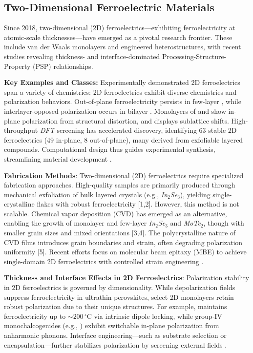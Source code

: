 \documentclass[a4paper,fleqn]{cas-sc}
\begin{document}
\subsection*{Two-Dimensional Ferroelectric Materials}
\par Since 2018, two-dimensional (2D) ferroelectrics—exhibiting ferroelectricity at atomic-scale thicknesses—have emerged as a pivotal research frontier. These include van der Waals monolayers and engineered heterostructures, with recent studies revealing thickness- and interface-dominated Processing-Structure-Property (PSP) relationships.

\par \textbf{Key Examples and Classes:} Experimentally demonstrated 2D ferroelectrics span a variety of chemistries: 2D ferroelectrics exhibit diverse chemistries and polarization behaviors. Out-of-plane ferroelectricity persists in few-layer , while interlayer-opposed polarization occurs in bilayer . Monolayers of  and  show in-plane polarization from structural distortion, and  displays sublattice shifts. High-throughput \textit{DFT} screening has accelerated discovery, identifying \num{63} stable 2D ferroelectrics (\num{49} in-plane, \num{8} out-of-plane), many derived from exfoliable layered compounds. Computational design thus guides experimental synthesis, streamlining material development \cite{kruse2023two}.

\par \textbf{Fabrication Methods}:  Two-dimensional (2D) ferroelectrics require specialized fabrication approaches. High-quality samples are primarily produced through mechanical exfoliation of bulk layered crystals (e.g., \textit{In}$_2$\textit{Se}$_3$), yielding single-crystalline flakes with robust ferroelectricity [1,2]. However, this method is not scalable. Chemical vapor deposition (CVD) has emerged as an alternative, enabling the growth of monolayer and few-layer \textit{In}$_2$\textit{Se}$_3$ and \textit{MoTe}$_2$, though with smaller grain sizes and mixed orientations [3,4]. The polycrystalline nature of CVD films introduces grain boundaries and strain, often degrading polarization uniformity [5]. Recent efforts focus on molecular beam epitaxy (MBE) to achieve single-domain 2D ferroelectrics with controlled strain engineering \cite{pelella2023two,xu2021two,huang2022two}.

\par \textbf{Thickness and Interface Effects in 2D Ferroelectrics}: Polarization stability in 2D ferroelectrics is governed by dimensionality. While depolarization fields suppress ferroelectricity in ultrathin perovskites, select 2D monolayers retain robust polarization due to their unique structures. For example,  maintains ferroelectricity up to $\sim\!200\,^{\circ}\mathrm{C}$ via intrinsic dipole locking, while group-IV monochalcogenides (e.g., ) exhibit switchable in-plane polarization from anharmonic phonons. Interface engineering---such as substrate selection or  encapsulation---further stabilizes polarization by screening external fields \cite{kruse2023two,huang2022two}.
\end{document}
